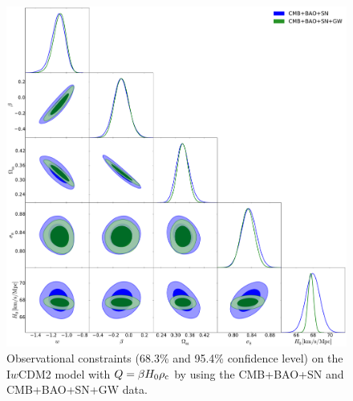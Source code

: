 \documentclass[aps,prd,nofootinbib,amsmath,amssymb,superscriptaddress,twocolumn,10pt]{revtex4}%
\begin{document}
\begin{figure}[!htp]
\includegraphics[scale=0.25]{iwcdmh0pc.pdf}

\centering \caption{\label{fig4} Observational constraints (68.3\% and 95.4\% confidence level) on the I$w$CDM2 model with $Q=\beta H_{0} \rho_{\rm c}$ by using the CMB+BAO+SN and CMB+BAO+SN+GW data.}
\end{figure}


\end{document}
